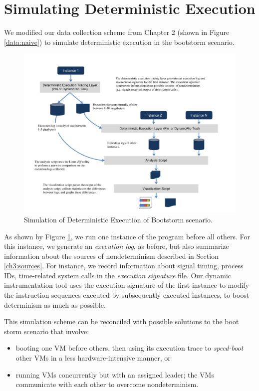 \section{Simulating Deterministic Execution} \label{ch3:simulation}
We modified our data collection scheme from Chapter 2 (shown in Figure \ref{data:naive})
to simulate deterministic execution in the bootstorm scenario.

\begin{figure}[h]
  \center
  \includegraphics[scale=0.7, trim=1cm 0cm 1cm 0cm]
                  {simulation.pdf}
  \caption[Simulation of Deterministic Execution of Bootstorm scenario]%
  {Simulation of Deterministic Execution of Bootstorm scenario.}
  \label{ch3:simulation}
\end{figure}

As shown by Figure \ref{ch3:simulation}, we run one instance of the program before all others.
For this instance, we generate an {\em execution log}, as before,
but also summarize information about the sources of nondeterminism
described in Section \ref{ch3:sources}. For instance, we record
information about signal timing, process IDs, time-related system calls
in the {\em execution signature} file. Our dynamic instrumentation tool
uses the execution signature of the first instance 
to modify the instruction sequences executed by subsequently
executed instances, to boost determinism as much as possible.

This simulation scheme can be reconciled with possible solutions to the 
boot storm scenario that involve:
\begin{itemize}
\item
booting one VM before others,
then using its execution trace to {\em speed-boot} other VMs
in a less hardware-intensive manner, or
\item 
running VMs concurrently but with an assigned leader;
the VMs communicate with each other to overcome
nondeterminism.
\end{itemize}


